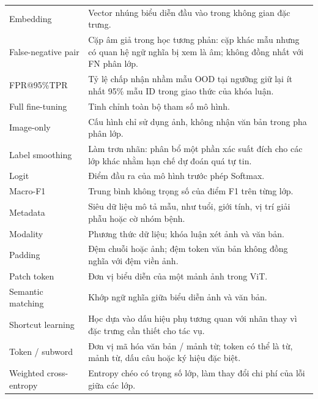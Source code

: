 \begin{longtable}{@{}p{}p{}@{}}
Embedding & Vector nhúng biểu diễn đầu vào trong không gian đặc trưng. \\
False-negative pair & Cặp âm giả trong học tương phản: cặp khác mẫu nhưng có quan hệ ngữ nghĩa bị xem là âm; không đồng nhất với FN phân lớp. \\
FPR@95\%TPR & Tỷ lệ chấp nhận nhầm mẫu OOD tại ngưỡng giữ lại ít nhất 95\% mẫu ID trong giao thức của khóa luận. \\
Full fine-tuning & Tinh chỉnh toàn bộ tham số mô hình. \\
Image-only & Cấu hình chỉ sử dụng ảnh, không nhận văn bản trong pha phân lớp. \\
Label smoothing & Làm trơn nhãn: phân bổ một phần xác suất đích cho các lớp khác nhằm hạn chế dự đoán quá tự tin. \\
Logit & Điểm đầu ra của mô hình trước phép Softmax. \\
Macro-F1 & Trung bình không trọng số của điểm F1 trên từng lớp. \\
Metadata & Siêu dữ liệu mô tả mẫu, như tuổi, giới tính, vị trí giải phẫu hoặc cờ nhóm bệnh. \\
Modality & Phương thức dữ liệu; khóa luận xét ảnh và văn bản. \\
Padding & Đệm chuỗi hoặc ảnh; đệm token văn bản không đồng nghĩa với đệm viền ảnh. \\
Patch token & Đơn vị biểu diễn của một mảnh ảnh trong ViT. \\
Semantic matching & Khớp ngữ nghĩa giữa biểu diễn ảnh và văn bản. \\
Shortcut learning & Học dựa vào dấu hiệu phụ tương quan với nhãn thay vì đặc trưng cần thiết cho tác vụ. \\
Token / subword & Đơn vị mã hóa văn bản / mảnh từ; token có thể là từ, mảnh từ, dấu câu hoặc ký hiệu đặc biệt. \\
Weighted cross-entropy & Entropy chéo có trọng số lớp, làm thay đổi chi phí của lỗi giữa các lớp. \\
\end{longtable}
\endgroup
